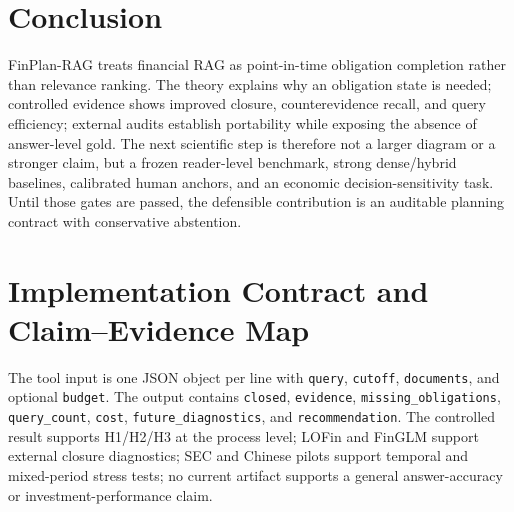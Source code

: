 \documentclass[12pt]{article}
\begin{document}
\section{Conclusion}
FinPlan-RAG treats financial RAG as point-in-time obligation completion rather than relevance ranking. The theory explains why an obligation state is needed; controlled evidence shows improved closure, counterevidence recall, and query efficiency; external audits establish portability while exposing the absence of answer-level gold. The next scientific step is therefore not a larger diagram or a stronger claim, but a frozen reader-level benchmark, strong dense/hybrid baselines, calibrated human anchors, and an economic decision-sensitivity task. Until those gates are passed, the defensible contribution is an auditable planning contract with conservative abstention.

\appendix
\section{Implementation Contract and Claim--Evidence Map}
The tool input is one JSON object per line with \texttt{query}, \texttt{cutoff}, \texttt{documents}, and optional \texttt{budget}. The output contains \texttt{closed}, \texttt{evidence}, \texttt{missing\_obligations}, \texttt{query\_count}, \texttt{cost}, \texttt{future\_diagnostics}, and \texttt{recommendation}. The controlled result supports H1/H2/H3 at the process level; LOFin and FinGLM support external closure diagnostics; SEC and Chinese pilots support temporal and mixed-period stress tests; no current artifact supports a general answer-accuracy or investment-performance claim.

\nocite{simplemem,actmem,oblivion,memoryworth,trivium,govmem,zou2026demem,tan2025rmm,yuan2026retrieval,zhou2025mem1,kim2025premem,cai2025fracom,tan2025membench,hu2025memoryagentbench,murphy2003dynamic,manski2003partial,stoye2012minimax,hernan2020causal,imbens2015causal,auer2002bandit,li2006abstraction,abel2020abstraction,zhu2025fintmmb}


\end{document}
